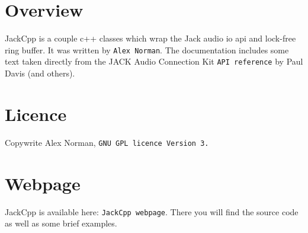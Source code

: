 \section{Overview}\label{index_Overview}
JackCpp is a couple c++ classes which wrap the Jack audio io api and lock-free ring buffer. It was written by {\tt Alex Norman}. The documentation includes some text taken directly from the JACK Audio Connection Kit {\tt API reference} by Paul Davis (and others).\section{Licence}\label{index_Licence}
Copywrite Alex Norman, {\tt GNU GPL licence Version 3.}\section{Webpage}\label{index_Webpage}
JackCpp is available here: {\tt JackCpp webpage}. There you will find the source code as well as some brief examples. 